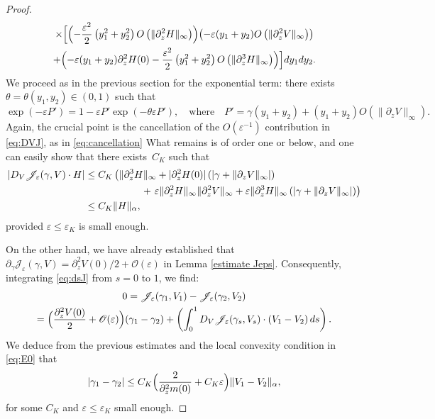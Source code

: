 \documentclass[10pt]{amsart}
\let\mathcal\mathscr
\newcommand{\cO}{\mathcal{O}}
\theoremstyle{plain}
\theoremstyle{definition}
\newcommand{\Je}{\mathcal{J}_\eps}
\let\eps\varepsilon
\newcommand{\abs}[1]{\left\lvert#1\right\rvert}
\begin{document}
\begin{proof}
\begin{multline}
\times
\Bigl[ \Bigl (- \frac{\eps^2}2\left (y_1^2 + y_2^2 \right) O\left (\|\partial_z^2 H\|_\infty \right) \Bigr) \bigl(-\eps (y_1 + y_2) O\left (\|\partial_z^2 V\|_\infty \right) \bigr) \\ +
\Bigl(-\eps (y_1 + y_2)\partial_z^2 H(0) - \frac{\eps^2}2\left (y_1^2 + y_2^2 \right) O\left (\|\partial_z^3H\|_\infty \right) \Bigr) \Bigr] d y_1 d y_2.
\end{multline}
We proceed as in the previous section for the exponential term: there exists $\theta = \theta(y_1,y_2)\in (0,1)$ such that
\begin{equation*}
\exp (- \eps P') = 1 - \eps P' \exp(-\theta \eps P'), \quad \text{where}\quad P' = \gamma (y_1+y_2) + (y_1 + y_2) O\left (\|\partial_z V\|_\infty \right).
\end{equation*}
Again, the crucial point is the cancellation of the $O(\eps^{-1})$ contribution in \eqref{eq:DVJ}, as in \eqref{eq:cancellation}
What remains is of order one or below, and one can easily show that there exists~$C_K$ such that
\begin{align*}
\abs{D_V \Je(\gamma,V)\cdot H}& \leq C_K \left (\|\partial_z^3H\|_\infty + |\partial_z^2 H(0)| \left (|\gamma + \|\partial_z V\|_\infty | \right) \right.\\
& \hspace*{2cm} + \left. \eps \|\partial_z^2H\|_\infty \|\partial_z^2V\|_\infty + \eps \|\partial_z^3H\|_\infty \left (|\gamma + \|\partial_z V\|_\infty | \right) \right)\\
& \leq C_K \|H\|_\alpha ,
\end{align*}
provided $\eps \leq \eps_K$ is small enough.

On the other hand, we have already established that $\partial_\gamma \Je(\gamma,V) = \partial_z^2 V(0)/2 + \cO(\eps)$ in Lemma \ref{estimate Jeps}. Consequently, integrating \eqref{eq:dsJ} from $s = 0$ to $1$, we find:
\begin{multline*}
0 = \Je(\gamma_1,V_1) - \Je(\gamma_2,V_2)\\
= \Bigl (\frac{\partial_z^2 V(0)}2 + \cO(\eps) \Bigr) (\gamma_1 - \gamma_2) + \left (\int_0^1 D_V \Je (\gamma_s,V_s)\cdot (V_1 - V_2)\, ds\right).
\end{multline*}
We deduce from the previous estimates and the local convexity condition in \eqref{eq:E0} that
\begin{equation*}
|\gamma_1 - \gamma_2| \leq C_K \Bigl (\dfrac{2 }{\partial_z^2m(0)} + C_K\eps \Bigr) \|V_1 - V_2\|_\alpha ,
\end{equation*}
for some $C_K$ and $\eps \leq \eps_K$ small enough.
\end{proof}
\end{document}
